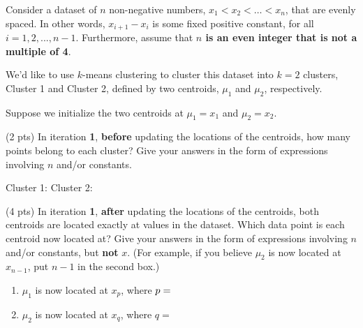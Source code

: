 \documentclass[twoside,12pt]{article}
\begin{document}
\begin{probset}
\begin{prob}[(20 pts)]
\end{prob}

\newpage

\begin{prob}[(11 pts)]


Consider a dataset of $n$ non-negative numbers, $x_1 < x_2 < \ldots < x_n$, that are evenly spaced. In other words, $x_{i+1} - x_i$ is some fixed positive constant, for all $i = 1, 2, ..., n-1$. Furthermore, assume that \textbf{$n$ is an even integer that is not a multiple of 4}.

We'd like to use $k$-means clustering to cluster this dataset into $k = 2$ clusters, Cluster 1 and Cluster 2, defined by two centroids, $\mu_1$ and $\mu_2$, respectively.

Suppose we initialize the two centroids at $\mu_1 = x_1$ and $\mu_2 = x_2$.

\begin{subprobset}

\begin{subprob}(2 pts) In iteration \textbf{1}, \textbf{before} updating the locations of the centroids, how many points belong to each cluster? Give your answers in the form of expressions involving $n$ and/or constants.

Cluster 1: \inlineresponsebox[1.75in]{} \hspace{0.5in} Cluster 2: \inlineresponsebox[1.75in]{}

\end{subprob}

\begin{subprob}(4 pts)  In iteration \textbf{1}, \textbf{after} updating the locations of the centroids, both centroids are located exactly at values in the dataset. Which data point is each centroid now located at? Give your answers in the form of expressions involving $n$ and/or constants, but \textbf{not} $x$. (For example, if you believe $\mu_2$ is now located at $x_{n-1}$, put $n-1$ in the second box.)

\begin{enumerate}[label=(\roman*)]
    \item $\mu_1$ is now located at $x_p$, where $p = \hspace{0.05in} $\inlineresponsebox[1.75in]{}
    \item $\mu_2$ is now located at $x_q$, where $q = $ \inlineresponsebox[1.75in]{}

\end{enumerate}
    

\end{subprob}
\end{subprobset}
\end{prob}
\end{probset}
\end{document}
